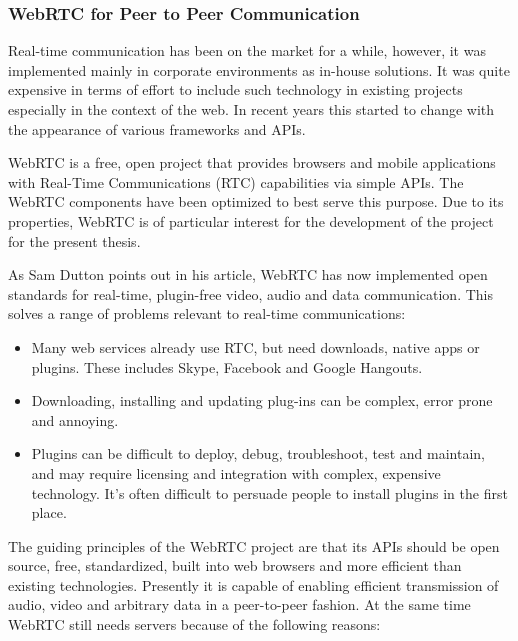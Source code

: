 \subsubsection{WebRTC for Peer to Peer Communication} %

Real-time communication has been on the market for a while, however, it was
implemented mainly in corporate environments as in-house solutions. It was quite
expensive in terms of effort to include such technology in existing projects
especially in the context of the web. In recent years this started to change
with the appearance of various frameworks and APIs.

WebRTC\cite{webrtc_org} is a free, open project that provides browsers and
mobile applications with Real-Time Communications (RTC) capabilities via simple
APIs. The WebRTC components have been optimized to best serve this purpose.
Due to its properties, WebRTC is of particular interest for the development
of the project for the present thesis.

As Sam Dutton points out in his article\cite{webrtc_basics}, WebRTC has now
implemented open standards for real-time, plugin-free video, audio and data
communication. This solves a range of problems relevant to real-time
communications:

\begin{itemize}
    \item Many web services already use RTC, but need downloads, native apps or
        plugins. These includes Skype, Facebook and Google Hangouts.

    \item Downloading, installing and updating plug-ins can be complex, error
        prone and annoying.

    \item Plugins can be difficult to deploy, debug, troubleshoot, test and
        maintain, and may require licensing and integration with complex,
        expensive technology. It's often difficult to persuade people to install
        plugins in the first place.
\end{itemize}

The guiding principles of the WebRTC project are that its APIs should be open
source, free, standardized, built into web browsers and more efficient than
existing technologies. Presently it is capable of enabling efficient
transmission of audio, video and arbitrary data in a peer-to-peer fashion. At
the same time WebRTC still needs servers because of the following
reasons\cite{webrtc_realworld}:

